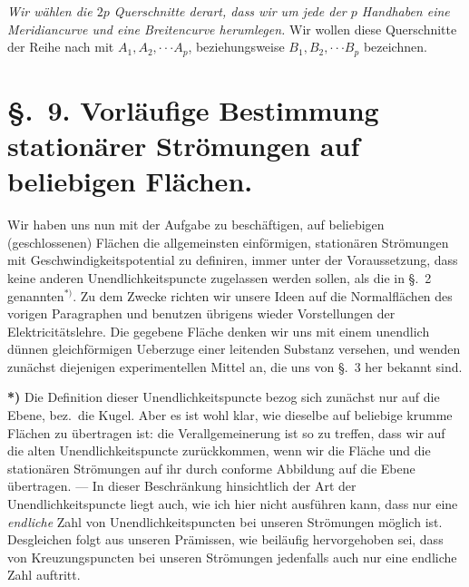 \documentclass{article}
\begin{document}

\emph{Wir wählen die $2p$ Querschnitte derart, dass wir um jede der $p$ Handhaben eine Meridiancurve und eine Breitencurve herumlegen.} Wir wollen diese Querschnitte der Reihe nach mit $A_{1}, A_{2}, \cdot\cdot\cdot A_{p}$, beziehungsweise $B_{1}, B_{2}, \cdot\cdot\cdot B_{p}$ bezeichnen.

\section*{§.~9. Vorläufige Bestimmung stationärer Strömungen auf beliebigen Flächen.}

Wir haben uns nun mit der Aufgabe zu beschäftigen, auf beliebigen (geschlossenen) Flächen die allgemeinsten einförmigen, stationären Strömungen mit Geschwindigkeitspotential zu definiren, immer unter der Voraussetzung, dass keine anderen Unendlichkeitspuncte zugelassen werden sollen, als die in §.~2 genannten${}^{*)}$. Zu dem Zwecke richten wir unsere Ideen auf die Normalflächen des vorigen Paragraphen und benutzen übrigens wieder Vorstellungen der Elektricitätslehre. Die gegebene Fläche denken wir uns mit einem unendlich dünnen gleichförmigen Ueberzuge einer leitenden Substanz versehen, und wenden zunächst diejenigen experimentellen Mittel an, die uns von §.~3 her bekannt sind.

\textbf{*)} Die Definition dieser Unendlichkeitspuncte bezog sich zunächst nur auf die Ebene, bez.\ die Kugel. Aber es ist wohl klar, wie dieselbe auf beliebige krumme Flächen zu übertragen ist: die Verallgemeinerung ist so zu treffen, dass wir auf die alten Unendlichkeitspuncte zurückkommen, wenn wir die Fläche und die stationären Strömungen auf ihr durch conforme Abbildung auf die Ebene übertragen. --- In dieser Beschränkung hinsichtlich der Art der Unendlichkeitspuncte liegt auch, wie ich hier nicht ausführen kann, dass nur eine \emph{endliche} Zahl von Unendlichkeitspuncten bei unseren Strömungen möglich ist. Desgleichen folgt aus unseren Prämissen, wie beiläufig hervorgehoben sei, dass von Kreuzungspuncten bei unseren Strömungen jedenfalls auch nur eine endliche Zahl auftritt.

\end{document}
